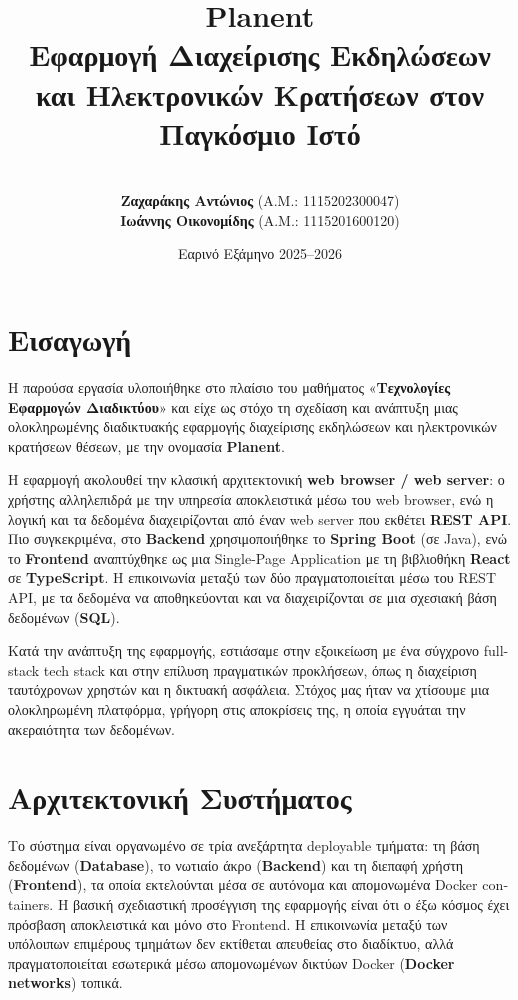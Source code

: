 \documentclass[12pt]{fphw}
\title{Planent \\ \large Εφαρμογή Διαχείρισης Εκδηλώσεων και Ηλεκτρονικών Κρατήσεων στον Παγκόσμιο Ιστό}
\author{\\ \large \textbf{Ζαχαράκης Αντώνιος} \small (Α.Μ.: 1115202300047) \\ \large \textbf{Ιωάννης Οικονομίδης} \small (Α.Μ.: 1115201600120)}
\institute{Εθνικό και Καποδιστριακό Πανεπιστήμιο Αθηνών \\ Τμήμα Πληροφορικής \& Τηλεπικοινωνιών}
\date{Εαρινό Εξάμηνο 2025–2026}
\newcommand{\en}[1]{\foreignlanguage{english}{#1}}
\begin{document}
\sloppy

\maketitle

\renewcommand{\contentsname}{Πίνακας Περιεχομένων}

\begingroup
\hypersetup{linkcolor=black}
\tableofcontents
\endgroup

\newpage

\section{Εισαγωγή}
Η παρούσα εργασία υλοποιήθηκε στο πλαίσιο του μαθήματος «\textbf{Τεχνολογίες Εφαρμογών Διαδικτύου}» και είχε ως στόχο τη σχεδίαση και ανάπτυξη μιας ολοκληρωμένης διαδικτυακής εφαρμογής διαχείρισης εκδηλώσεων και ηλεκτρονικών κρατήσεων θέσεων, με την ονομασία \textbf{Planent}.

Η εφαρμογή ακολουθεί την κλασική αρχιτεκτονική \textbf{web browser / web server}: ο χρήστης αλληλεπιδρά με την υπηρεσία αποκλειστικά μέσω του web browser, ενώ η λογική και τα δεδομένα διαχειρίζονται από έναν web server που εκθέτει \textbf{REST API}. Πιο συγκεκριμένα, στο \en{\textbf{Backend}} χρησιμοποιήθηκε το \en{\textbf{Spring Boot}} (σε \en{Java}), ενώ το \en{\textbf{Frontend}} αναπτύχθηκε ως μια \en{Single-Page Application} με τη βιβλιοθήκη \en{\textbf{React}} σε \en{\textbf{TypeScript}}. Η επικοινωνία μεταξύ των δύο πραγματοποιείται μέσω του \en{REST API}, με τα δεδομένα να αποθηκεύονται και να διαχειρίζονται σε μια σχεσιακή βάση δεδομένων (\en{\textbf{SQL}}).

Κατά την ανάπτυξη της εφαρμογής, εστιάσαμε στην εξοικείωση με ένα σύγχρονο \en{full-stack tech stack} και στην επίλυση πραγματικών προκλήσεων, όπως η διαχείριση ταυτόχρονων χρηστών και η δικτυακή ασφάλεια. Στόχος μας ήταν να χτίσουμε μια ολοκληρωμένη πλατφόρμα, γρήγορη στις αποκρίσεις της, η οποία εγγυάται την ακεραιότητα των δεδομένων.
\newpage

\section{Αρχιτεκτονική Συστήματος}
Το σύστημα είναι οργανωμένο σε τρία ανεξάρτητα \en{deployable} τμήματα: τη βάση δεδομένων (\en{\textbf{Database}}), το νωτιαίο άκρο (\en{\textbf{Backend}}) και τη διεπαφή χρήστη (\en{\textbf{Frontend}}), τα οποία εκτελούνται μέσα σε αυτόνομα και απομονωμένα \en{Docker containers}. Η βασική σχεδιαστική προσέγγιση της εφαρμογής είναι ότι ο έξω κόσμος έχει πρόσβαση αποκλειστικά και μόνο στο \en{Frontend}. Η επικοινωνία μεταξύ των υπόλοιπων επιμέρους τμημάτων δεν εκτίθεται απευθείας στο διαδίκτυο, αλλά πραγματοποιείται εσωτερικά μέσω απομονωμένων δικτύων Docker (\textbf{Docker networks}) τοπικά.
\end{document}
